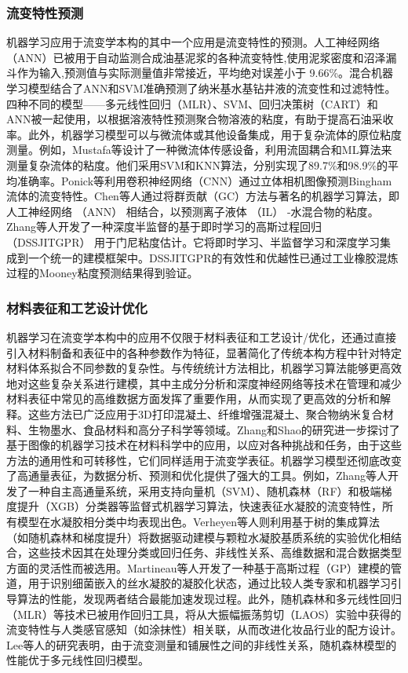 \subsubsection{流变特性预测}
机器学习应用于流变学本构的其中一个应用是流变特性的预测。人工神经网络（ANN）已被用于自动监测合成油基泥浆的各种流变特性,使用泥浆密度和沼泽漏斗作为输入,预测值与实际测量值非常接近，平均绝对误差小于 9.66\%\cite{alsabaaMachineLearningModel2022}。混合机器学习模型结合了ANN和SVM准确预测了纳米基水基钻井液的流变性和过滤特性。四种不同的模型——多元线性回归（MLR）、SVM、回归决策树（CART）和ANN被一起使用，以根据溶液特性预测聚合物溶液的粘度，有助于提高石油采收率\cite{shakeel2023application}。此外，机器学习模型可以与微流体或其他设备集成，用于复杂流体的原位粘度测量。例如，Mustafa等设计了一种微流体传感设备，利用流固耦合和ML算法来测量复杂流体的粘度\cite{mustafaMachineLearningBased2023}。他们采用SVM和KNN算法，分别实现了89.7\%和98.9\%的平均准确率。Ponick等利用卷积神经网络（CNN）通过立体相机图像预测Bingham流体的流变特性\cite{Ponick2022}。Chen等人通过将群贡献（GC）方法与著名的机器学习算法，即人工神经网络 （ANN） 相结合，以预测离子液体 （IL） -水混合物的粘度\cite{CHEN2022118546}。Zhang等人开发了一种深度半监督的基于即时学习的高斯过程回归 （DSSJITGPR） 用于门尼粘度估计\cite{polym14051018}。它将即时学习、半监督学习和深度学习集成到一个统一的建模框架中。DSSJITGPR的有效性和优越性已通过工业橡胶混炼过程的Mooney粘度预测结果得到验证。

\subsubsection{材料表征和工艺设计优化}
机器学习在流变学本构中的应用不仅限于材料表征和工艺设计/优化，还通过直接引入材料制备和表征中的各种参数作为特征，显著简化了传统本构方程中针对特定材料体系拟合不同参数的复杂性。与传统统计方法相比，机器学习算法能够更高效地对这些复杂关系进行建模，其中主成分分析和深度神经网络等技术在管理和减少材料表征中常见的高维数据方面发挥了重要作用，从而实现了更高效的分析和解释。这些方法已广泛应用于3D打印混凝土、纤维增强混凝土、聚合物纳米复合材料、生物墨水、食品材料和高分子科学等领域。Zhang和Shao的研究进一步探讨了基于图像的机器学习技术在材料科学中的应用，以应对各种挑战和任务，由于这些方法的通用性和可转移性，它们同样适用于流变学表征\cite{zhang2022image}。机器学习模型还彻底改变了高通量表征，为数据分析、预测和优化提供了强大的工具。例如，Zhang等人开发了一种自主高通量系统，采用支持向量机（SVM）、随机森林（RF）和极端梯度提升（XGB）分类器等监督式机器学习算法，快速表征水凝胶的流变特性，所有模型在水凝胶相分类中均表现出色\cite{zhangRapidAutonomousHighthroughput2023}。Verheyen等人则利用基于树的集成算法（如随机森林和梯度提升）将数据驱动建模与颗粒水凝胶基质系统的实验优化相结合，这些技术因其在处理分类或回归任务、非线性关系、高维数据和混合数据类型方面的灵活性而被选用\cite{verheyenIntegratedDatadrivenModeling2023}。Martineau等人开发了一种基于高斯过程（GP）建模的管道，用于识别细菌嵌入的丝水凝胶的凝胶化状态，通过比较人类专家和机器学习引导算法的性能，发现两者结合最能加速发现过程\cite{martineauEngineeringGelationKinetics2022}。此外，随机森林和多元线性回归（MLR）等技术已被用作回归工具，将从大振幅振荡剪切（LAOS）实验中获得的流变特性与人类感官感知（如涂抹性）相关联，从而改进化妆品行业的配方设计。Lee等人的研究表明，由于流变测量和铺展性之间的非线性关系，随机森林模型的性能优于多元线性回归模型\cite{lee2022predictive}。

